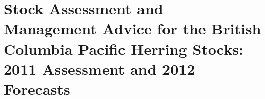 

\part{Stock Assessment and Management Advice for the British Columbia Pacific Herring Stocks: 2011 Assessment and 2012 Forecasts}

\addtocounter{chapter}{1}









